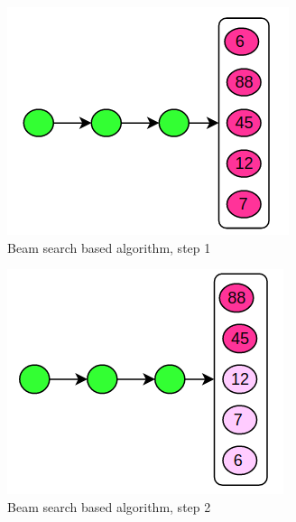 




\begin{figure}[!ht]
	\begin{center}  
		\includegraphics[scale=0.4]{beam-algo-1.png}
		\caption{Beam search based algorithm, step 1}
		\label{figure:beam1}	
	\end{center}
\end{figure}

\begin{figure}[!ht]
	\begin{center}  
		\includegraphics[scale=0.4]{beam-algo-2.png}
		\caption{Beam search based algorithm, step 2}
		\label{figure:beam2}	
	\end{center}
\end{figure}

